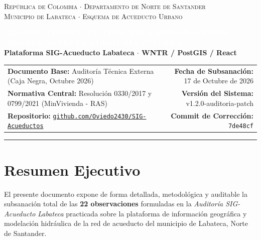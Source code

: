 \documentclass[11pt,letterpaper]{article}
\begin{document}
\begin{center}
    {\large \textsc{República de Colombia $\cdot$ Departamento de Norte de Santander}}\\[0.2em]
    {\large \textsc{Municipio de Labateca $\cdot$ Esquema de Acueducto Urbano}}\\[1.5em]
    
    \begin{tcolorbox}[colback=NavyMain,colframe=NavyMain,arc=2mm,halign=center]
        \vspace{0.4em}
        {\LARGE \textbf{\textcolor{white}{INFORME TÉCNICO DE ATENCIÓN Y SUBSANACIÓN DE OBSERVACIONES DE AUDITORÍA EXTERNA}}}\\[0.5em]
        {\large \textbf{\textcolor{TealAccent!30}{Plataforma SIG-Acueducto Labateca $\cdot$ WNTR / PostGIS / React}}}\\[0.2em]
        \vspace{0.3em}
    \end{tcolorbox}
    \vspace{0.5em}

    \begin{tabularx}{\textwidth}{Xr}
        \textbf{Documento Base:} Auditoría Técnica Externa (Caja Negra, Octubre 2026) & \textbf{Fecha de Subsanación:} 17 de Octubre de 2026 \\
        \textbf{Normativa Central:} Resolución 0330/2017 y 0799/2021 (MinVivienda - RAS) & \textbf{Versión del Sistema:} v1.2.0-auditoria-patch \\
        \textbf{Repositorio:} \href{https://github.com/Oviedo2430/SIG-Acueductos}{\texttt{github.com/Oviedo2430/SIG-Acueductos}} & \textbf{Commit de Corrección:} \texttt{7de48cf}
    \end{tabularx}
\end{center}

\vspace{0.8em}
\hrule
\vspace{1em}

\section{Resumen Ejecutivo}

El presente documento expone de forma detallada, metodológica y auditable la subsanación total de las \textbf{22 observaciones} formuladas en la \textit{Auditoría SIG-Acueducto Labateca} practicada sobre la plataforma de información geográfica y modelación hidráulica de la red de acueducto del municipio de Labateca, Norte de Santander.
\end{document}
